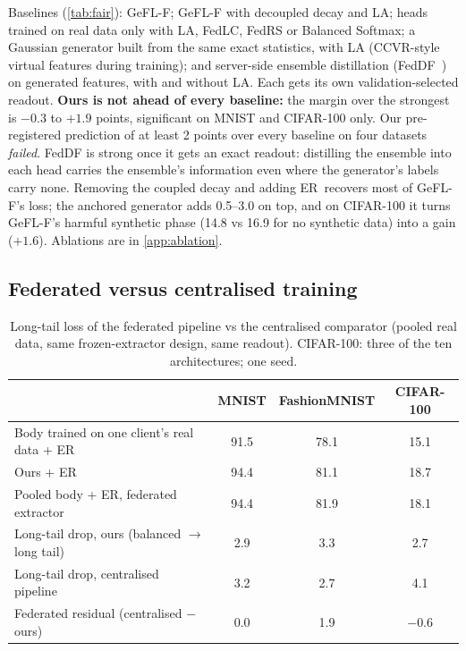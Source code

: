 \documentclass[10pt]{article}
\theoremstyle{plain}
\theoremstyle{definition}
\newcommand{\ER}{\textsc{ER}}
\begin{document}
Baselines (\cref{tab:fair}): GeFL-F; GeFL-F with decoupled decay and LA; heads trained on real data only with LA,
FedLC, FedRS or Balanced Softmax; a Gaussian generator built from the same exact statistics, with LA (CCVR-style
virtual features during training); and server-side ensemble distillation (FedDF~\cite{lin2020feddf}) on generated
features, with and without LA. Each gets its own validation-selected readout. \textbf{Ours is not ahead of every
baseline:} the margin over the strongest is $-0.3$ to $+1.9$ points, significant on MNIST and CIFAR-100 only. Our
pre-registered prediction of at least 2 points over every baseline on four datasets \emph{failed}. FedDF is strong once
it gets an exact readout: distilling the ensemble into each head carries the ensemble's information even where the
generator's labels carry none. Removing the coupled decay and adding \ER\ recovers most of GeFL-F's loss; the
anchored generator adds 0.5--3.0 on top, and on CIFAR-100 it turns GeFL-F's harmful synthetic phase (14.8 vs 16.9 for
no synthetic data) into a gain ($+1.6$). Ablations are in \cref{app:ablation}.

\subsection{Federated versus centralised training}\label{sec:central}

\begin{table}[t]
\centering\small
\caption{Long-tail loss of the federated pipeline vs the centralised comparator (pooled real data, same
frozen-extractor design, same readout). CIFAR-100: three of the ten architectures; one seed.}
\label{tab:central}
\begin{tabular}{lccc}
\toprule
& MNIST & FashionMNIST & CIFAR-100\\
\midrule
Body trained on one client's real data + \ER & 91.5 & 78.1 & 15.1\\
Ours + \ER & 94.4 & 81.1 & 18.7\\
Pooled body + \ER, federated extractor & 94.4 & 81.9 & 18.1\\
\midrule
Long-tail drop, ours (balanced $\to$ long tail) & 2.9 & 3.3 & 2.7\\
Long-tail drop, centralised pipeline & 3.2 & 2.7 & 4.1\\
Federated residual (centralised $-$ ours) & 0.0 & 1.9 & $-0.6$\\
\bottomrule
\end{tabular}
\end{table}
\end{document}

